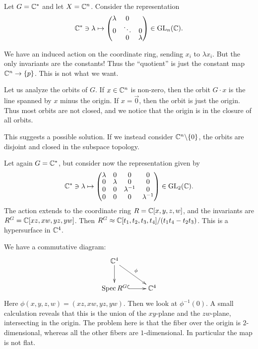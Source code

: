 \documentclass[11pt, english]{article}
\begin{document}
\begin{example}
  Let $G = \mathbb{C}^\ast$ and let $X = \mathbb{C}^n$. Consider the representation
$$
\C^\ast \ni \lambda \mapsto
\begin{pmatrix}
  \lambda & 0 & \\
0 & \ddots &0 \\
&0 & \lambda
\end{pmatrix} \in \GL_n(\C).
$$

We have an induced action on the coordinate ring, sending $x_i$ to $\lambda x_i$. But the only invariants are the constants! Thus the ``quotient'' is just the constant map $\mathbb{C}^n \to \{p\}$. This is not what we want.

Let us analyze the orbits of $G$. If $x \in \mathbb{C}^n$ is non-zero, then the orbit $G \cdot x$ is the line spanned by $x$ minus the origin. If $x=\vec 0$, then the orbit is just the origin. Thus most orbits are not closed, and we notice that the origin is in the closure of all orbits.

This suggests a possible solution. If we instead consider $\mathbb{C}^n \backslash \{ 0\}$, the orbits are disjoint and closed in the subspace topology.
\end{example}

\begin{example}
Let again $G = \mathbb{C}^\ast$, but consider now the representation given by
$$
\C^\ast \ni \lambda \mapsto
\begingroup
\renewcommand*{\arraystretch}{0.8}
\begin{pmatrix}
  \lambda & 0& 0& 0 \\
0& \lambda & 0 &0  \\
0  & 0 & \lambda^{-1} &0 \\
0& 0 &0& \lambda^{-1}
\end{pmatrix}  \in \GL_2(\C).
\endgroup
$$
The action extends to the coordinate ring $R= \mathbb{C}[x,y,z,w]$, and the invariants are $R^G=\mathbb{C}[xz,xw,yz,yw]$. Then $R^G \approx \mathbb{C}[t_1,t_2,t_3,t_4]/(t_1t_4-t_2t_3)$. This is a hypersurface in $\mathbb{C}^4$.

We have a commutative diagram:
\[
\xymatrix{
\C^4 \ar[d] \ar[dr]^\phi & \\
\Spec R^G \ar@{^(->}[r] & \C^4
}
\]
Here $\phi(x,y,z,w)=(xz,xw,yz,yw)$. Then we look at $\phi^{-1}(0)$. A small calculation reveals that this is the union of the $xy$-plane and the $zw$-plane, intersecting in the origin. The problem here is that the fiber over the origin is $2$-dimensional, whereas all the other fibers are $1$-dimensional. In particular the map is not flat.
\end{example}
\end{document}
